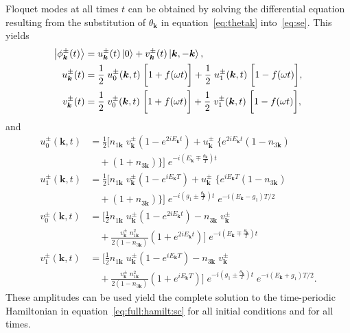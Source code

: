 \documentclass[preprint,5p,times,twocolumn]{elsarticle}
\newcommand{\bmk}{\bm{k}}
\begin{document}
Floquet modes at all times $t$ can be obtained by solving the differential equation resulting from the substitution of $\theta_{\bmk}$ in equation~\ref{eq:thetak} into~\ref{eq:se}. This yields
\begin{align}
    \ket{\phi^\pm_{\bmk}(t)} &= u_{\bmk}^{\pm}(t)\ket{0} + v_{\bmk}^{\pm}(t)\ket{\bmk, -\bmk},\nonumber\\
    u^\pm_{\bmk}(t) &= \frac12\;u^\pm_0(\bmk,t)\;\bigg[1+f(\omega t)\bigg] + \frac12\;u^\pm_1(\bmk,t)\;\bigg[1-f(\omega t)\bigg],  \nonumber \\
    v^\pm_{\bmk}(t) &= \frac12\;v^\pm_0(\bmk,t)\;\bigg[1+f(\omega t)\bigg] + \frac12\;v^\pm_1(\bmk,t)\;\bigg[1-f(\omega t)\bigg],
    \label{eq:floquet:modes}
\end{align}
and
\begin{align}
    u^\pm_0(\bmk,t) &=\frac12 \Bigg[n^{\;}_{1\bmk}\;v^\pm_{\bmk} \left(1 - e^{2 i E_{\bmk} t}\right) + u^\pm_{\bmk}\;\bigg\{
    e^{2iE_{\bmk}t}\left(1-n^{\;}_{3\bmk}\right)\nonumber\\ 
    &\quad + \left(1+n^{\;}_{3\bmk}\right)
    \bigg\}\Bigg] \; e^{- i \left(E_{\bmk}\mp\frac{\theta_{\bmk}}{T}\right)t} \nonumber \\
    u^\pm_1(\bmk,t) &= \frac12 \Bigg[n^{\;}_{1\bmk}\; v^\pm_{\bmk} \left(1 - e^{ i E_{\bmk} T}\right) + u^\pm_{\bmk}\; \bigg\{
    e^{iE_{\bmk}T}\left(1-n^{\;}_{3\bmk}\right) \nonumber\\
    &\quad + \left(1+n^{\;}_{3\bmk}\right)
    \bigg\}\Bigg]\;e^{-i \left(g_1\pm\frac{\theta_{\bmk}}{T}\right)t}\;e^{-i\left(E_{\bmk}-g_1\right)T/2}\nonumber\\
    v^\pm_0(\bmk,t) &= \Bigg[\frac12 n^{\;}_{1\bmk}\;u^\pm_{\bmk}\left(1-e^{2iE_{\bmk}t}\right)-n^{\;}_{3\bmk}\;v^\pm_{\bmk} \nonumber\\
    &\quad+ \frac{v^\pm_{\bmk}\;n^2_{1\bmk}}{2\left(1-n^{\;}_{3\bmk}\right)}\left(1+e^{2iE_{\bmk}t}\right)\Bigg]\;e^{- i \left(E_{\bmk}\mp\frac{\theta_{\bmk}}{T}\right)t} \nonumber\\
    v^\pm_1(\bmk,t) &=\Bigg[\frac12 n^{\;}_{1\bmk}\;u^\pm_{\bmk}\left(1-e^{iE_{\bmk}T}\right)-n^{\;}_{3\bmk}\;v^\pm_{\bmk} \nonumber\\
    &\quad + \frac{v^\pm_{\bmk}\;n^2_{1\bmk}}{2\left(1-n^{\;}_{3\bmk}\right)}\left(1+e^{iE_{\bmk}T}\right)\Bigg]\;e^{-i \left(g_1\pm\frac{\theta_{\bmk}}{T}\right)t}\;e^{-i\left(E_{\bmk}+g_1\right)T/2}.
    \label{eq:floquet:amplitudes}
\end{align}
These amplitudes can be used yield the complete solution to the time-periodic Hamiltonian in equation~\ref{eq:full:hamilt:sc} for all initial conditions and for all times.
\end{document}
